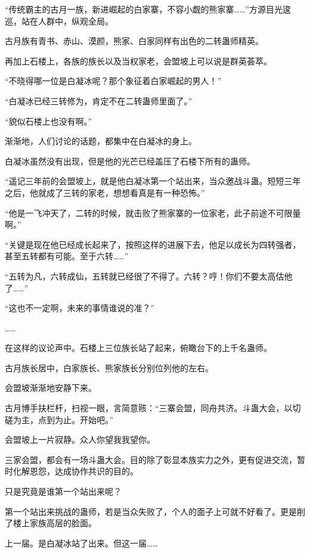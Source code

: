 
\begin{this_body}

“传统霸主的古月一族，新进崛起的白家寨，不容小觑的熊家寨……”方源目光逡巡，站在人群中，纵观全局。

古月族有青书、赤山、漠颜，熊家、白家同样有出色的二转蛊师精英。

再加上石楼上，各族的族长以及当权家老，会盟坡上可以说是群英荟萃。

“不晓得哪一位是白凝冰呢？那个象征着白家崛起的男人！”

“白凝冰已经三转修为，肯定不在二转蛊师里面了。”

“貌似石楼上也没有啊。”

渐渐地，人们讨论的话题，都集中在白凝冰的身上。

白凝冰虽然没有出现，但是他的光芒已经盖压了石楼下所有的蛊师。

“遥记三年前的会盟坡上，就是他白凝冰第一个站出来，当众邀战斗蛊。短短三年之后，他就成了三转的家老，想想看真是有一种恐怖。”

“他是一飞冲天了，二转的时候，就击败了熊家寨的一位家老，此子前途不可限量啊。”

“关键是现在他已经成长起来了，按照这样的进展下去，他足以成长为四转强者，甚至五转都有可能。至于六转……”

“五转为凡，六转成仙，五转就已经很了不得了。六转？哼！你们不要太高估他了……”

“这也不一定啊，未来的事情谁说的准？”

……

在这样的议论声中。石楼上三位族长站了起来，俯瞰台下的上千名蛊师。

古月族长居中，白家族长、熊家族长分别位列他的左右。

会盟坡渐渐地安静下来。

古月博手扶栏杆，扫视一眼，言简意赅：“三寨会盟，同舟共济。斗蛊大会，以切磋为主，点到为止。开始吧。”

会盟坡上一片寂静。众人你望我我望你。

三家会盟，都会有一场斗蛊大会。目的除了彰显本族实力之外，更有促进交流，暂时化解恩怨，达成协作共识的目的。

只是究竟是谁第一个站出来呢？

第一个站出来挑战的蛊师，若是当众失败了，个人的面子上可就不好看了。更是削了楼上家族高层的脸面。

上一届。是白凝冰站了出来。但这一届……


\end{this_body}

